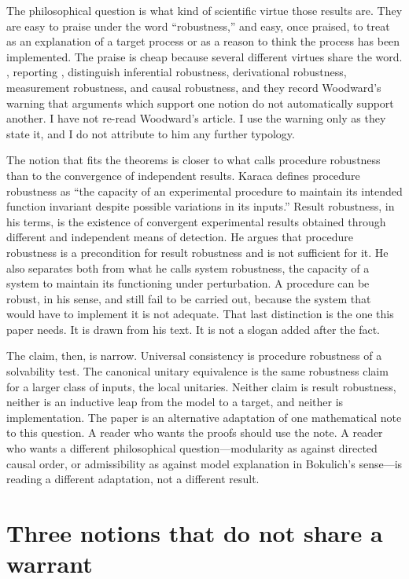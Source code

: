 \documentclass[12pt]{article}
\begin{document}
The philosophical question is what kind of scientific virtue those results are. They are easy to praise under the word ``robustness,'' and easy, once praised, to treat as an explanation of a target process or as a reason to think the process has been implemented. The praise is cheap because several different virtues share the word. \citet{kuorikoski2007}, reporting \citet{woodward2006}, distinguish inferential robustness, derivational robustness, measurement robustness, and causal robustness, and they record Woodward's warning that arguments which support one notion do not automatically support another. I have not re-read Woodward's article. I use the warning only as they state it, and I do not attribute to him any further typology.

The notion that fits the theorems is closer to what \citet{karaca2022} calls procedure robustness than to the convergence of independent results. Karaca defines procedure robustness as ``the capacity of an experimental procedure to maintain its intended function invariant despite possible variations in its inputs.'' Result robustness, in his terms, is the existence of convergent experimental results obtained through different and independent means of detection. He argues that procedure robustness is a precondition for result robustness and is not sufficient for it. He also separates both from what he calls system robustness, the capacity of a system to maintain its functioning under perturbation. A procedure can be robust, in his sense, and still fail to be carried out, because the system that would have to implement it is not adequate. That last distinction is the one this paper needs. It is drawn from his text. It is not a slogan added after the fact.

The claim, then, is narrow. Universal consistency is procedure robustness of a solvability test. The canonical unitary equivalence is the same robustness claim for a larger class of inputs, the local unitaries. Neither claim is result robustness, neither is an inductive leap from the model to a target, and neither is implementation. The paper is an alternative adaptation of one mathematical note to this question. A reader who wants the proofs should use the note. A reader who wants a different philosophical question---modularity as against directed causal order, or admissibility as against model explanation in Bokulich's sense---is reading a different adaptation, not a different result.

\section{Three notions that do not share a warrant}
\label{sec:three}
\end{document}
